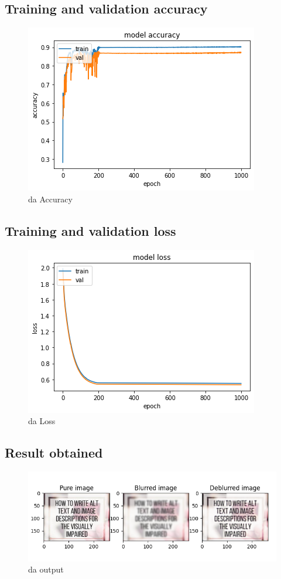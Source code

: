 \subsection{Training and validation accuracy}
\begin{figure}[H]
\centering
	\includegraphics[scale=1]{Figures/denoise_accuracy.png}	
	\caption{\acrlong{da} Accuracy}
	\label{fig:denoise_accuracy}
\end{figure}
\subsection{Training and validation loss}
\begin{figure}[H]
\centering
	\includegraphics[scale=1]{Figures/denoise_loss.png}	
	\caption{\acrlong{da} Loss}
	\label{fig:denoise_loss}
\end{figure}
\subsection{Result obtained}
\begin{figure}[H]
\centering
	\includegraphics[scale=0.7]{Figures/denoise1.png}	
	\caption{\acrlong{da} output}
	\label{fig:denoise}
\end{figure}

